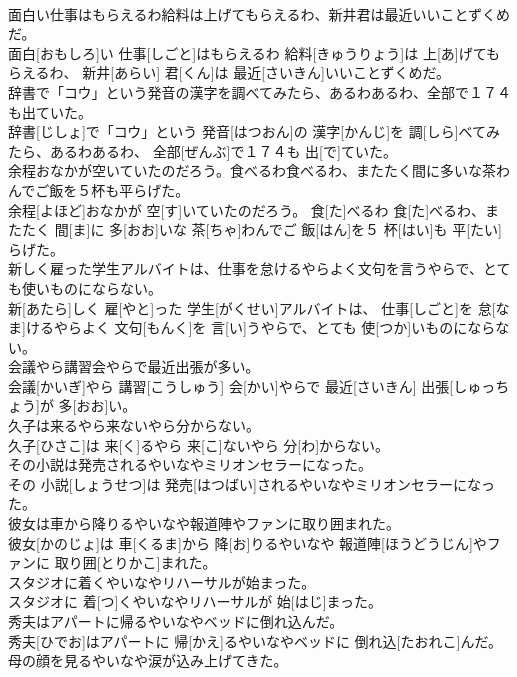 \documentclass[8pt]{extreport}
\begin{document}
\begin{CJK}{UTF8}{min}
\\	面白い仕事はもらえるわ給料は上げてもらえるわ、新井君は最近いいことずくめだ。	
\\	面白[おもしろ]い 仕事[しごと]はもらえるわ 給料[きゅうりょう]は 上[あ]げてもらえるわ、 新井[あらい] 君[くん]は 最近[さいきん]いいことずくめだ。
\\	辞書で「コウ」という発音の漢字を調べてみたら、あるわあるわ、全部で１７４も出ていた。	
\\	辞書[じしょ]で「コウ」という 発音[はつおん]の 漢字[かんじ]を 調[しら]べてみたら、あるわあるわ、 全部[ぜんぶ]で１７４も 出[で]ていた。
\\	余程おなかが空いていたのだろう。食べるわ食べるわ、またたく間に多いな茶わんでご飯を５杯も平らげた。	
\\	余程[よほど]おなかが 空[す]いていたのだろう。 食[た]べるわ 食[た]べるわ、またたく 間[ま]に 多[おお]いな 茶[ちゃ]わんでご 飯[はん]を５ 杯[はい]も 平[たい]らげた。
\\	新しく雇った学生アルバイトは、仕事を怠けるやらよく文句を言うやらで、とても使いものにならない。	
\\	新[あたら]しく 雇[やと]った 学生[がくせい]アルバイトは、 仕事[しごと]を 怠[なま]けるやらよく 文句[もんく]を 言[い]うやらで、とても 使[つか]いものにならない。
\\	会議やら講習会やらで最近出張が多い。	
\\	会議[かいぎ]やら 講習[こうしゅう] 会[かい]やらで 最近[さいきん] 出張[しゅっちょう]が 多[おお]い。
\\	久子は来るやら来ないやら分からない。	
\\	久子[ひさこ]は 来[く]るやら 来[こ]ないやら 分[わ]からない。
\\	その小説は発売されるやいなやミリオンセラーになった。	
\\	その 小説[しょうせつ]は 発売[はつばい]されるやいなやミリオンセラーになった。
\\	彼女は車から降りるやいなや報道陣やファンに取り囲まれた。	
\\	彼女[かのじょ]は 車[くるま]から 降[お]りるやいなや 報道陣[ほうどうじん]やファンに 取り囲[とりかこ]まれた。
\\	スタジオに着くやいなやリハーサルが始まった。	
\\	スタジオに 着[つ]くやいなやリハーサルが 始[はじ]まった。
\\	秀夫はアパートに帰るやいなやベッドに倒れ込んだ。	
\\	秀夫[ひでお]はアパートに 帰[かえ]るやいなやベッドに 倒れ込[たおれこ]んだ。
\\	母の顔を見るやいなや涙が込み上げてきた。	

\end{CJK}
\end{document}
